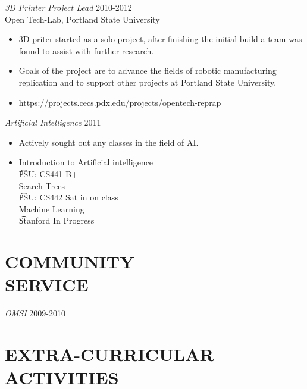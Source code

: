 \documentclass[margin]{res}
\begin{document}
\begin{resume}
				{\sl 3D Printer Project Lead} \hfill 2010-2012 \\
                Open Tech-Lab, Portland State University
				\begin{itemize}  \itemsep -2pt %
					\item  	3D priter started as a solo project, after
					 		finishing the initial build a team was found to
							assist with further research.
					\item  	Goals of the project are to advance the fields of 
					 		robotic manufacturing replication and to support
							other projects at Portland State University.
					\item   https://projects.cecs.pdx.edu/projects/opentech-reprap
                \end{itemize}
 
 				{\sl Artificial Intelligence} \hfill 2011
				\begin{itemize} \itemsep -2pt
					\item	Actively sought out any classes in the field of 
							AI.
					\item	Introduction to Artificial intelligence \\
							\t PSU: CS441 B+ \\
							Search Trees \\
							\t PSU: CS442 Sat in on class \\
							Machine Learning \\
							\t Stanford In Progress\\
				\end{itemize}
					 
\section{COMMUNITY \\ SERVICE}  
				{\sl OMSI} \hfil 2009-2010



\section{EXTRA-CURRICULAR \\ ACTIVITIES}             
				 

\end{resume}
\end{document}
